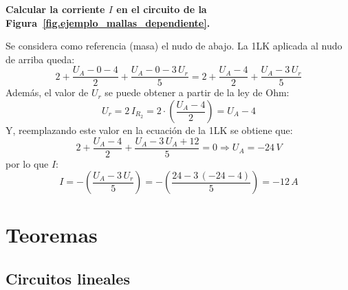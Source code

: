 	\begin{example}\label{ex.nudos_mod_fdep}
          \textbf{Calcular la corriente $I$ en el circuito de la
            Figura~\ref{fig.ejemplo_mallas_dependiente}.}
	    
          Se considera como referencia (masa) el nudo de abajo. La 1LK
          aplicada al nudo de arriba queda:
          \begin{equation*}
            2+\dfrac{U_A-0-4}{2}+\dfrac{U_A-0-3\,U_r}{5}=2+\dfrac{U_A-4}{2}+\dfrac{U_A-3\,U_r}{5}
          \end{equation*}
          Además, el valor de $U_r$ se puede obtener a partir de la
          ley de Ohm:
          \begin{equation*}
            U_r=2\, I_{R_2}=2\cdot \left( \dfrac{U_A-4}{2} \right)=U_A-4
          \end{equation*}
          Y, reemplazando este valor en la ecuación de la 1LK se
          obtiene que:
          \begin{equation*}
            2+\dfrac{U_A-4}{2}+\dfrac{U_A-3\,U_A+12}{5}=0\Rightarrow U_A=-24\,V
          \end{equation*}
          por lo que $I$:
          \begin{equation*}
            I=-\left(\dfrac{U_A-3\,U_r}{5} \right)=-\left(\dfrac{24-3\,(-24-4)}{5}\right)=-12\,A
          \end{equation*}
	\end{example}
	
	\section{Teoremas}\label{sec.teoremas_CC}
	
	\subsection{Circuitos lineales}
	
